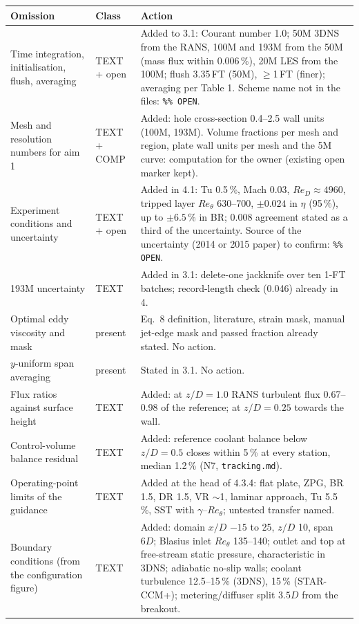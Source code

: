 \documentclass[10pt]{article}
\begin{document}
{\footnotesize
\begin{longtable}{@{}L{4.4cm} L{1.2cm} L{11.0cm}@{}}
\toprule
Omission & Class & Action \\
\midrule
\endhead
Time integration, initialisation, flush, averaging & TEXT + open & Added to 3.1: Courant number 1.0; 50M 3DNS from the RANS, 100M and 193M from the 50M (mass flux within 0.006\,\%), 20M LES from the 100M; flush 3.35\,FT (50M), $\ge$1\,FT (finer); averaging per Table 1. Scheme name not in the files: \texttt{\%\% OPEN}. \\
Mesh and resolution numbers for aim 1 & TEXT + COMP & Added: hole cross-section 0.4--2.5 wall units (100M, 193M). Volume fractions per mesh and region, plate wall units per mesh and the 5M curve: computation for the owner (existing open marker kept). \\
Experiment conditions and uncertainty & TEXT + open & Added in 4.1: Tu 0.5\,\%, Mach 0.03, $Re_D\approx4960$, tripped layer $Re_\theta$ 630--700, $\pm0.024$ in $\eta$ (95\,\%), up to $\pm6.5$\,\% in BR; 0.008 agreement stated as a third of the uncertainty. Source of the uncertainty (2014 or 2015 paper) to confirm: \texttt{\%\% OPEN}. \\
193M uncertainty & TEXT & Added in 3.1: delete-one jackknife over ten 1-FT batches; record-length check (0.046) already in 4. \\
Optimal eddy viscosity and mask & present & Eq.~8 definition, literature, strain mask, manual jet-edge mask and passed fraction already stated. No action. \\
$y$-uniform span averaging & present & Stated in 3.1. No action. \\
Flux ratios against surface height & TEXT & Added: at $z/D=1.0$ RANS turbulent flux 0.67--0.98 of the reference; at $z/D=0.25$ towards the wall. \\
Control-volume balance residual & TEXT & Added: reference coolant balance below $z/D=0.5$ closes within 5\,\% at every station, median 1.2\,\% (N7, \texttt{tracking.md}). \\
Operating-point limits of the guidance & TEXT & Added at the head of 4.3.4: flat plate, ZPG, BR 1.5, DR 1.5, VR $\sim$1, laminar approach, Tu 5.5\,\%, SST with $\gamma$--$Re_\theta$; untested transfer named. \\
Boundary conditions (from the configuration figure) & TEXT & Added: domain $x/D$ $-15$ to 25, $z/D$ 10, span $6D$; Blasius inlet $Re_\theta$ 135--140; outlet and top at free-stream static pressure, characteristic in 3DNS; adiabatic no-slip walls; coolant turbulence 12.5--15\,\% (3DNS), 15\,\% (STAR-CCM+); metering/diffuser split $3.5D$ from the breakout. \\

\end{longtable}}
\end{document}
